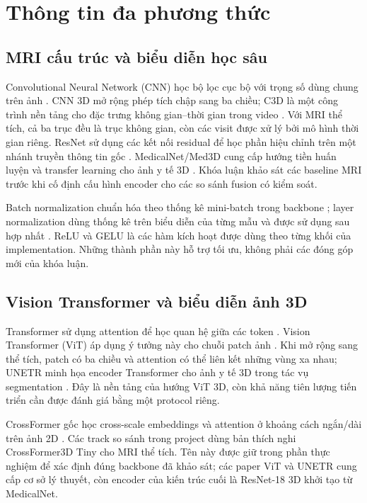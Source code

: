 \section{Thông tin đa phương thức}
\subsection{MRI cấu trúc và biểu diễn học sâu}
Convolutional Neural Network (CNN) học bộ lọc cục bộ với trọng số dùng chung trên ảnh \cite{lecun1998gradient}. CNN 3D mở rộng phép tích chập sang ba chiều; C3D là một công trình nền tảng cho đặc trưng không gian--thời gian trong video \cite{tran2015c3d}. Với MRI thể tích, cả ba trục đều là trục không gian, còn các visit được xử lý bởi mô hình thời gian riêng. ResNet sử dụng các kết nối residual để học phần hiệu chỉnh trên một nhánh truyền thông tin gốc \cite{he2016deep}. MedicalNet/Med3D cung cấp hướng tiền huấn luyện và transfer learning cho ảnh y tế 3D \cite{chen2019med3d}. Khóa luận khảo sát các baseline MRI trước khi cố định cấu hình encoder cho các so sánh fusion có kiểm soát.

Batch normalization chuẩn hóa theo thống kê mini-batch trong backbone \cite{ioffe2015batchnorm}; layer normalization dùng thống kê trên biểu diễn của từng mẫu và được sử dụng sau hợp nhất \cite{ba2016layernorm}. ReLU \cite{nair2010rectified} và GELU \cite{hendrycks2016gelu} là các hàm kích hoạt được dùng theo từng khối của implementation. Những thành phần này hỗ trợ tối ưu, không phải các đóng góp mới của khóa luận.

\subsection{Vision Transformer và biểu diễn ảnh 3D}
Transformer sử dụng attention để học quan hệ giữa các token \cite{vaswani2017attention}. Vision Transformer (ViT) áp dụng ý tưởng này cho chuỗi patch ảnh \cite{dosovitskiy2021vit}. Khi mở rộng sang thể tích, patch có ba chiều và attention có thể liên kết những vùng xa nhau; UNETR minh họa encoder Transformer cho ảnh y tế 3D trong tác vụ segmentation \cite{hatamizadeh2022unetr}. Đây là nền tảng của hướng ViT 3D, còn khả năng tiên lượng tiến triển cần được đánh giá bằng một protocol riêng.

CrossFormer gốc học cross-scale embeddings và attention ở khoảng cách ngắn/dài trên ảnh 2D \cite{wang2022crossformer}. Các track so sánh trong project dùng bản thích nghi CrossFormer3D Tiny cho MRI thể tích. Tên này được giữ trong phần thực nghiệm để xác định đúng backbone đã khảo sát; các paper ViT và UNETR cung cấp cơ sở lý thuyết, còn encoder của kiến trúc cuối là ResNet-18 3D khởi tạo từ MedicalNet.

